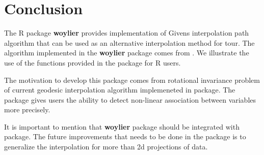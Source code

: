 \hypertarget{conclusion}{%
\section{Conclusion}\label{conclusion}}

The R package \textbf{woylier} provides implementation of Givens
interpolation path algorithm that can be used as an alternative
interpolation method for tour. The algorithm implemented in the
\textbf{woylier} package comes from
\citet{buja_cook_asimov_hurley_2005}. We illustrate the use of the
functions provided in the package for R users.

The motivation to develop this package comes from rotational invariance
problem of current geodesic interpolation algorithm implemeneted in
 package. The package gives users the ability to detect
non-linear association between variables more precisely.

It is important to mention that \textbf{woylier} package should be
integrated with  package. The future improvements that
needs to be done in the package is to generalize the interpolation for
more than 2d projections of data.



\address{%
Zoljargal Batsaikhan\\
Monash University\\%
Department of Econometrics and Business Statistics\\ Clayton, VIC,
Australia\\
%
\url{https://github.com/zolabat}\\%
\textit{ORCiD: \href{https://orcid.org/0009-0005-0055-1448}{0009-0005-0055-1448}}\\%
\href{mailto:zoljargal11@gmail.com}{\nolinkurl{zoljargal11@gmail.com}}%
}

\address{%
Dianne Cook\\
Monash University\\%
Department of Econometrics and Business Statistics\\ Clayton, VIC,
Australia\\
%
\url{http://www.dicook.org}\\%
\textit{ORCiD: \href{https://orcid.org/0000-0002-3813-7155}{0000-0002-3813-7155}}\\%
\href{mailto:dicook@monash.edu}{\nolinkurl{dicook@monash.edu}}%
}

\address{%
Ursula Laa\\
University of Natural Resources and Life Sciences Vienna\\%
Institute of Statistics\\ Vienna, Austria\\
%
\url{https://uschilaa.github.io}\\%
\textit{ORCiD: \href{https://orcid.org/0000-0002-0249-6439}{0000-0002-0249-6439}}\\%
\href{mailto:ursula.laa@boku.ac.at}{\nolinkurl{ursula.laa@boku.ac.at}}%
}
